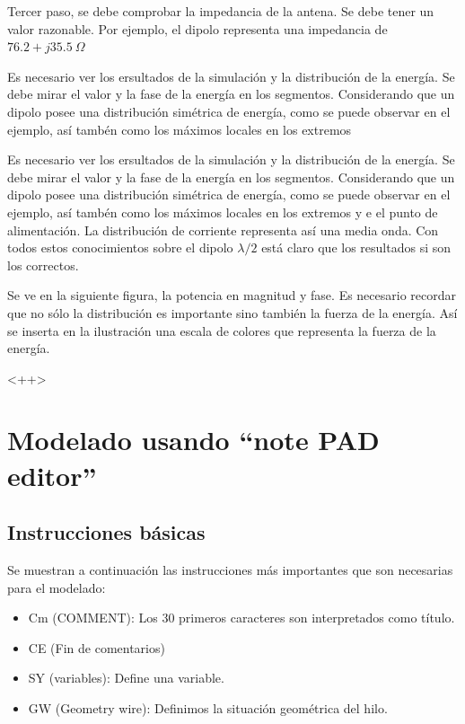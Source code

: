 \documentclass[12pt]{article}
\begin{document}
Tercer paso, se debe comprobar la impedancia de la antena. Se debe tener un
valor razonable. Por ejemplo, el dipolo representa una impedancia de
$76.2+j35.5\ \Omega$

Es necesario ver los ersultados de la simulaci\'on y la distribuci\'on de la energ\'ia. Se debe mirar el valor y la fase de la energ\'ia en los segmentos. Considerando que un dipolo posee una distribuci\'on sim\'etrica de energ\'ia, como se puede observar en el ejemplo, as\'i tamb\'en como los m\'aximos locales en los extremos

Es necesario ver los ersultados de la simulaci\'on y la distribuci\'on de la
energ\'ia. Se debe mirar el valor y la fase de la energ\'ia en los segmentos.
Considerando que un dipolo posee una distribuci\'on sim\'etrica de energ\'ia,
como se puede observar en el ejemplo, as\'i tamb\'en como los m\'aximos locales
en los extremos y e el punto de alimentaci\'on. La distribuci\'on de corriente representa as\'i una media onda. Con todos estos conocimientos sobre el dipolo $\lambda/2$ est\'a claro que los resultados si son los correctos.

Se ve en la siguiente figura, la potencia en magnitud y fase. Es necesario recordar que no s\'olo la distribuci\'on es importante sino tambi\'en la fuerza de la energ\'ia. As\'i se inserta en la ilustraci\'on una escala de colores que representa la fuerza de la energ\'ia.

<++> %

\section{Modelado usando ``note PAD editor''}

\subsection{Instrucciones b\'asicas}

Se muestran a continuaci\'on las instrucciones m\'as importantes que son necesarias para el modelado:

\begin{itemize}
    \item Cm (COMMENT): Los 30 primeros caracteres son interpretados como título.
    \item CE (Fin de comentarios)
    \item SY (variables): Define una variable.
    \item GW (Geometry wire): Definimos la situación geométrica del hilo.
\end{itemize}
\end{document}
